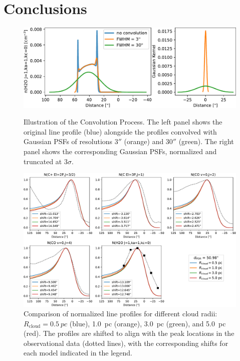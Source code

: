 \documentclass[12pt,a4paper]{article}
\newcommand{\mr}{\mathrm}
\begin{document}
\section{Conclusions} \label{sec:conclusion}


\clearpage
\printbibliography

\clearpage
\appendix
\begin{figure}[h]
    \centering
    \includegraphics[width=.88\textwidth,keepaspectratio]{convolution_nosurfchem.pdf}
    \caption{Illustration of the Convolution Process. The left panel shows the original line profile (blue) alongside the profiles convolved with Gaussian PSFs of resolutions $3''$ (orange) and $30''$ (green). The right panel shows the corresponding Gaussian PSFs, normalized and truncated at $3\sigma$.} \label{fig:convolution_nosurfchem}

    \vspace{2em}

    \includegraphics[width=\textwidth,keepaspectratio]{comp_curvature_obs_shape.pdf}
    \caption{Comparison of normalized line profiles for different cloud radii: $R_\mr{cloud} = \qty{0.5}{pc}$ (blue), \qty{1.0}{pc} (orange), \qty{3.0}{pc} (green), and \qty{5.0}{pc} (red). The profiles are shifted to align with the peak locations in the observational data (dotted lines), with the corresponding shifts for each model indicated in the legend.} \label{fig:comprad_shape}
\end{figure}
\end{document}
